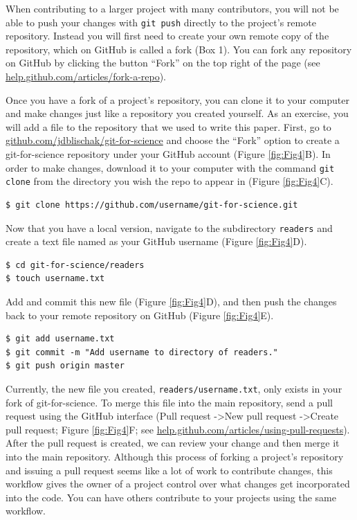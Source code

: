 \documentclass[10pt]{article}
\begin{document}
When contributing to a larger project with many contributors, you will not be able to push your changes with \verb|git push| directly to the project's remote repository.
Instead you will first need to create your own remote copy of the repository, which on GitHub is called a fork (Box 1).
You can fork any repository on GitHub by clicking the button ``Fork'' on the top right of the page (see \href{https://help.github.com/articles/fork-a-repo/}{help.github.com/articles/fork-a-repo}).

Once you have a fork of a project's repository, you can clone it to your computer and make changes just like a repository you created yourself.
As an exercise, you will add a file to the repository that we used to write this paper.
First, go to \href{https://github.com/jdblischak/git-for-science}{github.com/jdblischak/git-for-science} and choose the ``Fork'' option to create a git-for-science repository under your GitHub account (Figure \ref{fig:Fig4}B).
In order to make changes, download it to your computer with the command \verb|git clone| from the directory you wish the repo to appear in (Figure \ref{fig:Fig4}C).

\begin{verbatim}
$ git clone https://github.com/username/git-for-science.git
\end{verbatim}

Now that you have a local version, navigate to the subdirectory \verb|readers| and create a text file named as your GitHub username (Figure \ref{fig:Fig4}D).

\begin{verbatim}
$ cd git-for-science/readers
$ touch username.txt
\end{verbatim}

Add and commit this new file (Figure \ref{fig:Fig4}D), and then push the changes back to your remote repository on GitHub (Figure \ref{fig:Fig4}E).

\begin{verbatim}
$ git add username.txt
$ git commit -m "Add username to directory of readers."
$ git push origin master
\end{verbatim}

Currently, the new file you created, \verb|readers/username.txt|, only exists in your fork of git-for-science.
To merge this file into the main repository, send a pull request using the GitHub interface (Pull request -\textgreater New pull request -\textgreater Create pull request; Figure \ref{fig:Fig4}F; see \href{https://help.github.com/articles/using-pull-requests/}{help.github.com/articles/using-pull-requests}).
After the pull request is created, we can review your change and then merge it into the main repository.
Although this process of forking a project’s repository and issuing a pull request seems like a lot of work to contribute changes, this workflow gives the owner of a project control over what changes get incorporated into the code.
You can have others contribute to your projects using the same workflow.
\end{document}
